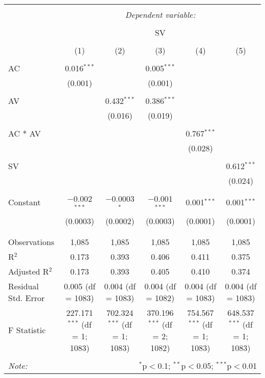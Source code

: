 
\begin{table}[!htbp] \centering 
  \caption{} 
  \label{} 
\begin{tabular}{@{\extracolsep{5pt}}lccccc} 
\\[-1.8ex]\hline 
\hline \\[-1.8ex] 
 & \multicolumn{5}{c}{\textit{Dependent variable:}} \\ 
\cline{2-6} 
\\[-1.8ex] & \multicolumn{5}{c}{SV} \\ 
\\[-1.8ex] & (1) & (2) & (3) & (4) & (5)\\ 
\hline \\[-1.8ex] 
 AC & 0.016$^{***}$ &  & 0.005$^{***}$ &  &  \\ 
  & (0.001) &  & (0.001) &  &  \\ 
  & & & & & \\ 
 AV &  & 0.432$^{***}$ & 0.386$^{***}$ &  &  \\ 
  &  & (0.016) & (0.019) &  &  \\ 
  & & & & & \\ 
 AC * AV &  &  &  & 0.767$^{***}$ &  \\ 
  &  &  &  & (0.028) &  \\ 
  & & & & & \\ 
 SV &  &  &  &  & 0.612$^{***}$ \\ 
  &  &  &  &  & (0.024) \\ 
  & & & & & \\ 
 Constant & $-$0.002$^{***}$ & $-$0.0003$^{*}$ & $-$0.001$^{***}$ & 0.001$^{***}$ & 0.001$^{***}$ \\ 
  & (0.0003) & (0.0002) & (0.0003) & (0.0001) & (0.0001) \\ 
  & & & & & \\ 
\hline \\[-1.8ex] 
Observations & 1,085 & 1,085 & 1,085 & 1,085 & 1,085 \\ 
R$^{2}$ & 0.173 & 0.393 & 0.406 & 0.411 & 0.375 \\ 
Adjusted R$^{2}$ & 0.173 & 0.393 & 0.405 & 0.410 & 0.374 \\ 
Residual Std. Error & 0.005 (df = 1083) & 0.004 (df = 1083) & 0.004 (df = 1082) & 0.004 (df = 1083) & 0.004 (df = 1083) \\ 
F Statistic & 227.171$^{***}$ (df = 1; 1083) & 702.324$^{***}$ (df = 1; 1083) & 370.196$^{***}$ (df = 2; 1082) & 754.567$^{***}$ (df = 1; 1083) & 648.537$^{***}$ (df = 1; 1083) \\ 
\hline 
\hline \\[-1.8ex] 
\textit{Note:}  & \multicolumn{5}{r}{$^{*}$p$<$0.1; $^{**}$p$<$0.05; $^{***}$p$<$0.01} \\ 
\end{tabular} 
\end{table} 

